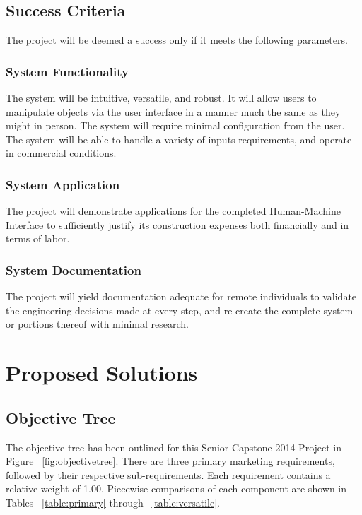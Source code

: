 \section{Success Criteria}
The project will be deemed a success only if it meets the following parameters.

\subsection{System Functionality}
The system will be intuitive, versatile, and robust.
It will allow users to manipulate objects via the user interface in a manner much the same as they might in person.
The system will require minimal configuration from the user.
The system will be able to handle a variety of inputs requirements, and operate in commercial conditions.

\subsection{System Application}
The project will demonstrate applications for the completed Human-Machine Interface to sufficiently justify its construction expenses both financially and in terms of labor.

\subsection{System Documentation}
The project will yield documentation adequate for remote individuals to validate the engineering decisions made at every step, and re-create the complete system or portions thereof with minimal research.

\chapter{Proposed Solutions}
\section{Objective Tree}
The objective tree has been outlined for this Senior Capstone 2014 Project in Figure ~\ref{fig:objectivetree}.
There are three primary marketing requirements, followed by their respective sub-requirements. Each requirement contains a relative weight of 1.00.
Piecewise comparisons of each component are shown in Tables ~\ref{table:primary} through ~\ref{table:versatile}.

